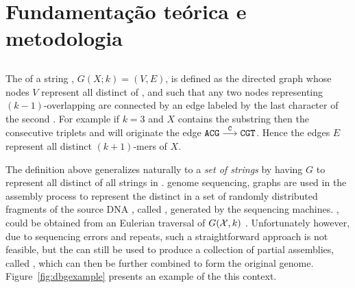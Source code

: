 \chapter{Fundamentação teórica e metodologia}


\section{}


The  of a string , $G(X;k)=(V,E)$, is defined as the directed graph whose nodes $V$ represent all distinct  of , and such that any two nodes representing $(k-1)$-overlapping \kmers are connected by an edge labeled by the last character of the second \kmer. For example if $k=3$ and $X$ contains the substring  then the consecutive triplets  and  will originate the edge $\mathtt{ACG}\stackrel{\mathtt{C}}{\longrightarrow}\mathtt{CGT}$. Hence the edges $E$ represent all distinct $(k+1)$-mers of $X$. 

The definition above generalizes naturally to a \emph{set of strings}  by having $G$ to represent all distinct  of all strings in .  genome sequencing, \dB graphs are used in the assembly process to represent the distinct \kmers in a set \readset of randomly distributed fragments of the source DNA , called , generated by the sequencing machines. ,  could be obtained from an Eulerian traversal of $G(\readset, k)$ \cite{}. Unfortunately however, due to sequencing errors and repeats, such a straightforward approach is not feasible, but the \dBG can still be used to produce a collection of partial assemblies, called , which can then be further combined to form the original genome. Figure~\ref{fig:dbgexample} presents an example of the \dBG {} this context.

